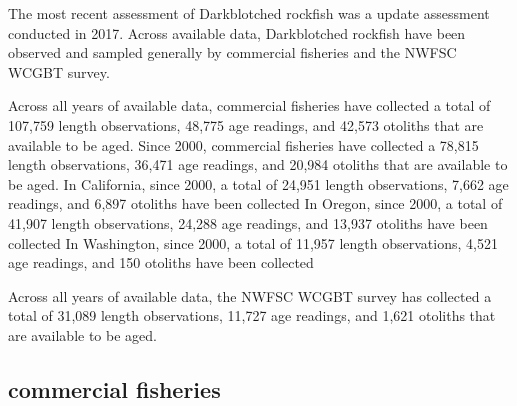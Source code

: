 \documentclass[11pt,
  english,
  letterpaper,
]{article}
\begin{document}
The most recent assessment of Darkblotched rockfish was a update assessment conducted in 2017. Across available data, Darkblotched rockfish have been observed and sampled generally by commercial fisheries and the NWFSC WCGBT survey.

\leavevmode\tagmcend\tagstructend\par


Across all years of available data, commercial fisheries have collected a total of 107,759 length observations, 48,775 age readings, and 42,573 otoliths that are available to be aged. Since 2000, commercial fisheries have collected a 78,815 length observations, 36,471 age readings, and 20,984 otoliths that are available to be aged. In California, since 2000, a total of 24,951 length observations, 7,662 age readings, and 6,897 otoliths have been collected In Oregon, since 2000, a total of 41,907 length observations, 24,288 age readings, and 13,937 otoliths have been collected In Washington, since 2000, a total of 11,957 length observations, 4,521 age readings, and 150 otoliths have been collected

\leavevmode\tagmcend\tagstructend\par


Across all years of available data, the NWFSC WCGBT survey has collected a total of 31,089 length observations, 11,727 age readings, and 1,621 otoliths that are available to be aged.

\leavevmode\tagmcend\tagstructend\par


\hypertarget{commercial-fisheries-17}{%
\subsection{commercial fisheries}\label{commercial-fisheries-17}}

\leavevmode\tagmcend\tagstructend


\begingroup\fontsize{10}{12}\selectfont \begingroup\fontsize{10}{12}\selectfont

\leavevmode\tagmcend\tagstructend\par
\end{document}
